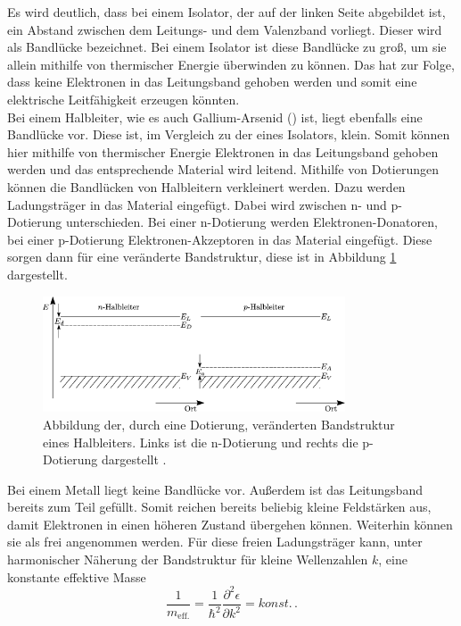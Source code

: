 Es wird deutlich, dass bei einem Isolator, der auf der linken Seite abgebildet ist, ein Abstand zwischen
dem Leitungs- und dem Valenzband vorliegt. Dieser wird als Bandlücke bezeichnet. Bei einem Isolator ist diese
Bandlücke zu groß, um sie allein mithilfe von thermischer Energie überwinden zu können. Das hat zur Folge,
dass keine Elektronen in das Leitungsband gehoben werden und somit eine elektrische Leitfähigkeit erzeugen könnten.\\
Bei einem Halbleiter, wie es auch Gallium-Arsenid () ist, liegt ebenfalls eine Bandlücke vor. Diese ist, im Vergleich
zu der eines Isolators, klein. Somit können hier mithilfe von thermischer Energie Elektronen in das Leitungsband
gehoben werden und das entsprechende Material wird leitend. Mithilfe von Dotierungen können die Bandlücken
von Halbleitern verkleinert werden. Dazu werden Ladungsträger in das Material eingefügt. Dabei wird zwischen
n- und p-Dotierung unterschieden. Bei einer n-Dotierung werden Elektronen-Donatoren, bei einer p-Dotierung
Elektronen-Akzeptoren in das Material eingefügt. Diese sorgen dann für eine veränderte Bandstruktur, diese
ist in Abbildung \ref{fig:BS_neu} dargestellt. \\
\begin{figure}[H]
    \centering
    \includegraphics[width=0.8\textwidth]{images/BS_neu.png}
    \caption{Abbildung der, durch eine Dotierung, veränderten Bandstruktur eines Halbleiters. Links ist die n-Dotierung und rechts die p-Dotierung dargestellt \cite{BS_neu}.}
    \label{fig:BS_neu}
\end{figure} \noindent
Bei einem Metall liegt keine Bandlücke vor. Außerdem ist das Leitungsband bereits zum Teil gefüllt. Somit reichen
bereits beliebig kleine Feldstärken aus, damit Elektronen in einen höheren Zustand übergehen können. Weiterhin
können sie als frei angenommen werden.
Für diese freien Ladungsträger kann, unter harmonischer Näherung der Bandstruktur für kleine Wellenzahlen $k$, eine konstante effektive Masse
\begin{equation}
  \frac{1}{m_\text{eff.}} = \frac{1}{\hbar^2}\frac{\partial^2 \epsilon}{\partial k^2} = konst. \, .
\end{equation}
